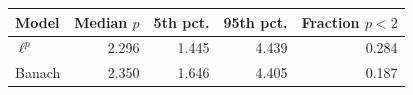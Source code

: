 \begin{tabular}{lrrrr}
\toprule
Model & Median $p$ & 5th pct. & 95th pct. & Fraction $p<2$ \\
\midrule
$\ell^p$ & 2.296 & 1.445 & 4.439 & 0.284 \\
Banach & 2.350 & 1.646 & 4.405 & 0.187 \\
\bottomrule
\end{tabular}

